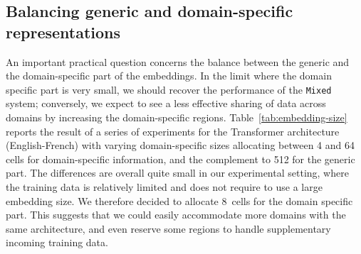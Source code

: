 \documentclass[a4paper]{article}
\newcommand{\fyTodo}[1]{\Todo[FY:]{\textcolor{orange}{#1}}}
\newcommand{\fyDone}[1]{\done[FY]\Todo[FY:]{\textcolor{orange}{#1}}}
\begin{document}

\subsection{Balancing generic and domain-specific representations\label{secc:region_size}}

An important practical question concerns the balance between the generic and the domain-specific part of the embeddings. In the limit where the domain specific part is very small, we should recover the performance of the \texttt{Mixed} system; conversely, we expect to see a less effective sharing of data across domains by increasing the domain-specific regions. Table~\ref{tab:embedding-size} reports the result of  a series of experiments for the Transformer architecture (English-French) with varying domain-specific sizes allocating between 4 and 64 cells for domain-specific information, and the complement to 512 for the generic part. The differences are overall quite small in our experimental setting, where the training data is relatively limited and does not require to use a large embedding size. We therefore decided to allocate $8$~cells for the domain specific part. This suggests that we could easily accommodate more domains with the same architecture, and even reserve some regions to handle supplementary incoming training data.  
\fyDone{Given the ways embeddings are computed, why not add more domains, and test robustness agains data presentation order ?}
\end{document}

